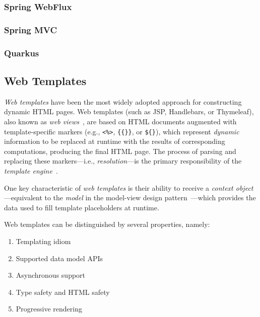 
\subsubsection{Spring WebFlux}

\subsubsection{Spring MVC}

\subsubsection{Quarkus}


\subsection{Web Templates}

\textit{Web templates} have been the most widely adopted approach for
constructing dynamic HTML pages.
Web templates (such as JSP, Handlebars, or Thymeleaf), also known as
\textit{web views}~\cite{Fowler02,Alur01}, are based on
HTML documents augmented with template-specific markers (e.g., \texttt{<\%>},
\texttt{\{\{\}\}}, or \texttt{\$\{\}}), which represent \textit{dynamic}
information to be replaced at runtime with the results of corresponding
computations, producing the final HTML page.
The process of parsing and replacing these markers---i.e.,
\textit{resolution}---is the primary responsibility of the \textit{template
engine}~\cite{Parr04}.

One key characteristic of \textit{web templates} is their ability to receive a 
\textit{context object}---equivalent to the \textit{model} in the model-view 
design pattern~\cite{mvc88,Parr04}---which provides the data used to fill 
template placeholders at runtime.

Web templates can be distinguished by several properties, namely:
\begin{enumerate}
    \item Templating idiom
    \item Supported data model APIs
    \item Asynchronous support
    \item Type safety and HTML safety
    \item Progressive rendering
\end{enumerate}

